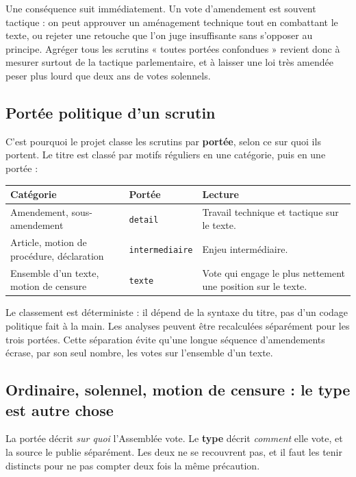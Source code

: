 \documentclass[11pt,a4paper]{article}
\newcommand{\code}[1]{\texttt{#1}}
\begin{document}
Une conséquence suit immédiatement. Un vote d'amendement est souvent tactique :
on peut approuver un aménagement technique tout en combattant le texte, ou
rejeter une retouche que l'on juge insuffisante sans s'opposer au principe.
Agréger tous les scrutins « toutes portées confondues » revient donc à mesurer
surtout de la tactique parlementaire, et à laisser une loi très amendée peser
plus lourd que deux ans de votes solennels.

\subsection{Portée politique d'un scrutin}

C'est pourquoi le projet classe les scrutins par \textbf{portée}, selon ce sur
quoi ils portent. Le titre est classé par motifs réguliers en une catégorie,
puis en une portée :

\begin{center}
\begin{tabular}{>{\raggedright\arraybackslash}p{.25\linewidth}p{.30\linewidth}p{.32\linewidth}}
\toprule
Catégorie & Portée & Lecture \\
\midrule
Amendement, sous-amendement & \code{detail} & Travail technique et tactique sur le texte. \\
Article, motion de procédure, déclaration & \code{intermediaire} & Enjeu intermédiaire. \\
Ensemble d'un texte, motion de censure & \code{texte} & Vote qui engage le plus nettement une position sur le texte. \\
\bottomrule
\end{tabular}
\end{center}

Le classement est déterministe : il dépend de la syntaxe du titre, pas d'un
codage politique fait à la main. Les analyses peuvent être recalculées séparément
pour les trois portées. Cette séparation évite qu'une longue séquence
d'amendements écrase, par son seul nombre, les votes sur l'ensemble d'un texte.

\subsection{Ordinaire, solennel, motion de censure : le type est autre chose}

La portée décrit \emph{sur quoi} l'Assemblée vote. Le \textbf{type} décrit
\emph{comment} elle vote, et la source le publie séparément. Les deux ne se
recouvrent pas, et il faut les tenir distincts pour ne pas compter deux fois la
même précaution.
\end{document}
